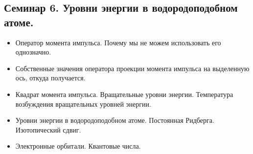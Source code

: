 \documentclass[12pt]{article}
\begin{document}
\subsection*{Семинар 6. Уровни энергии в водородоподобном атоме.}
\begin{itemize}
    \item Оператор момента импульса. Почему мы не можем использовать его однозначно.
    \item Собственные значения оператора проекции момента импульса на выделенную ось, откуда получается.
    \item Квадрат момента импульса. Вращательные уровни энергии. Температура возбуждения вращательных уровней энергии.
    \item Уровни энергии в водородоподобном атоме. Постоянная Ридберга. Изотопический сдвиг.
    \item Электронные орбитали. Квантовые числа.
\end{itemize}

\end{document}
